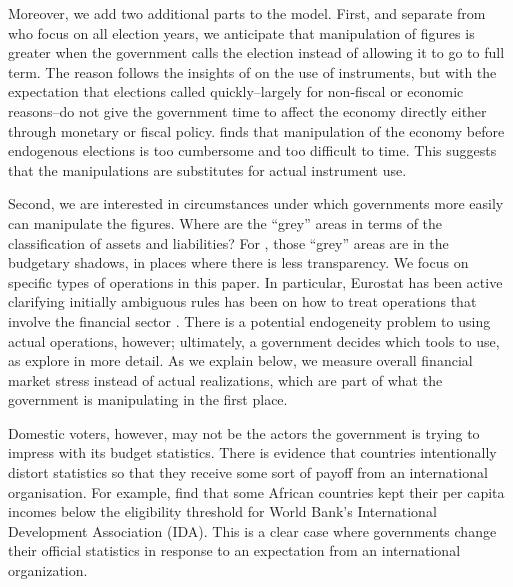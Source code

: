 \documentclass[]{article}
\begin{document}
Moreover, we add two additional parts to the model. First, and separate from \cite{Alt2014} who focus on all election years, we anticipate that manipulation of figures is greater when the government calls the election instead of allowing it to go to full term. The reason follows the insights of \cite{clark2003} on the use of instruments, but with the expectation that elections called quickly--largely for non-fiscal or economic reasons--do not give the government time to affect the economy directly either through monetary or fiscal policy. \cite{Kayser2005} finds that manipulation of the economy before endogenous elections is too cumbersome and too difficult to time. This suggests that the manipulations are substitutes for actual instrument use.

Second, we are interested in circumstances under which governments more easily can manipulate the figures. Where are the ``grey'' areas in terms of the classification of assets and liabilities? For \cite{Alt2014}, those ``grey'' areas are in the budgetary shadows, in places where there is less transparency. We focus on specific types of operations in this paper. In particular, Eurostat has been active clarifying initially ambiguous rules has been on how to treat operations that involve the financial sector \cite[see][]{GandrudHallerberg2016}. There is a potential endogeneity problem to using actual operations, however; ultimately, a government decides which tools to use, as \cite{GandrudHallerberg2016} explore in more detail. As we explain below, we measure  overall financial market stress instead of actual realizations, which are part of what the government is manipulating in the first place.

Domestic voters, however, may not be the actors the government is trying to impress with its budget statistics. There is evidence that countries intentionally distort statistics so that they receive some sort of payoff from an international organisation. For example, \cite{kerner2016} find that some African countries kept their per capita incomes below the eligibility threshold for World Bank’s International Development Association (IDA). This is a clear case where governments change their official statistics in response to an expectation from an international organization.
\end{document}
